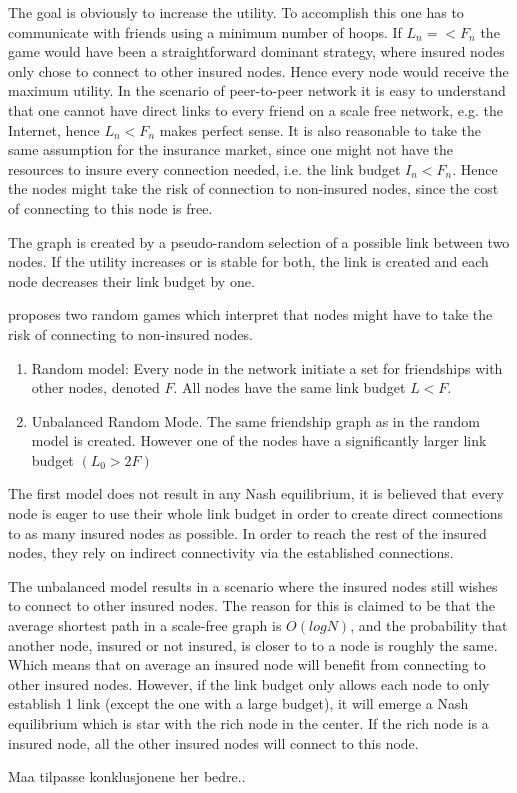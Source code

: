 The goal is obviously to increase the utility. To accomplish this one has to communicate with friends using a minimum number of hoops. If $L_{n}=<F_{n}$ the game would have been a straightforward dominant strategy, where insured nodes only chose to connect to other insured nodes. Hence every node would receive the maximum utility. In the scenario of peer-to-peer network it is easy to understand that one cannot have direct links to every friend on a scale free network, e.g. the Internet, hence $L_{n}<F_{n}$ makes perfect sense. It is also reasonable to take the same assumption  for the insurance market, since one might not have the resources to insure every connection needed, i.e. the link budget $I_{n} < F_{n}$. Hence the nodes might take the risk of connection to non-insured nodes, since the cost of connecting to this node is free.

The graph is created by a pseudo-random selection of a possible link between two nodes. If the utility increases or is stable for both, the link is created and each node decreases their link budget by one.

 
\cite{danezis2006network} proposes two random games which interpret that nodes might have to take the risk of connecting to non-insured nodes.
\begin{enumerate}
\item Random model: Every node in the network initiate a set for friendships with other nodes, denoted $F$. All nodes have the same link budget $L<F$. 
\item Unbalanced Random Mode. The same friendship graph as in the random model is created. However one of the nodes have a significantly larger link budget $(L_{0} > 2 F)$
\end{enumerate}

The first model does not result in any Nash equilibrium, it is believed that every node is eager to use their whole link budget in order to create direct connections to as many insured nodes as possible. In order to reach the rest of the insured nodes, they rely on indirect connectivity via the established connections.

The unbalanced model results in a scenario where the insured nodes still wishes to connect to other insured nodes. The reason for this is claimed to be that the average shortest path in a scale-free graph is $O(log N)$, and the probability that another node, insured or not insured, is closer to to a node is roughly the same. Which means that on average an insured node will benefit from connecting to other insured nodes. 
However, if the link budget only allows each node to only establish 1 link (except the one with a large budget), it will emerge a Nash equilibrium which is star with the rich node in the center. If the rich node is a insured node, all the other insured nodes will connect to this node. 

Maa tilpasse konklusjonene her bedre..





